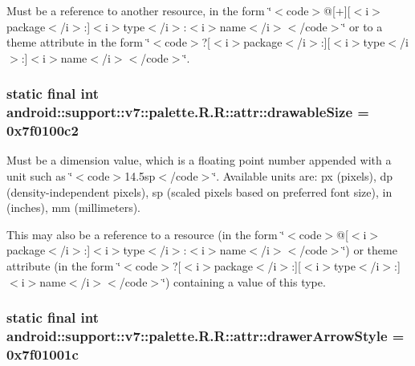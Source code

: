 Must be a reference to another resource, in the form \char`\"{}$<$code$>$@\mbox{[}+\mbox{]}\mbox{[}$<$i$>$package$<$/i$>$:\mbox{]}$<$i$>$type$<$/i$>$:$<$i$>$name$<$/i$>$$<$/code$>$\char`\"{} or to a theme attribute in the form \char`\"{}$<$code$>$?\mbox{[}$<$i$>$package$<$/i$>$:\mbox{]}\mbox{[}$<$i$>$type$<$/i$>$:\mbox{]}$<$i$>$name$<$/i$>$$<$/code$>$\char`\"{}. \hypertarget{classandroid_1_1support_1_1v7_1_1palette_1_1_r_1_1attr_825d54398676292cc2c09cd547800157}{
\subsubsection[{drawableSize}]{\setlength{\rightskip}{0pt plus 5cm}static final int android::support::v7::palette.R.R::attr::drawableSize = 0x7f0100c2}}
\label{classandroid_1_1support_1_1v7_1_1palette_1_1_r_1_1attr_825d54398676292cc2c09cd547800157}


Must be a dimension value, which is a floating point number appended with a unit such as \char`\"{}$<$code$>$14.5sp$<$/code$>$\char`\"{}. Available units are: px (pixels), dp (density-independent pixels), sp (scaled pixels based on preferred font size), in (inches), mm (millimeters). 

This may also be a reference to a resource (in the form \char`\"{}$<$code$>$@\mbox{[}$<$i$>$package$<$/i$>$:\mbox{]}$<$i$>$type$<$/i$>$:$<$i$>$name$<$/i$>$$<$/code$>$\char`\"{}) or theme attribute (in the form \char`\"{}$<$code$>$?\mbox{[}$<$i$>$package$<$/i$>$:\mbox{]}\mbox{[}$<$i$>$type$<$/i$>$:\mbox{]}$<$i$>$name$<$/i$>$$<$/code$>$\char`\"{}) containing a value of this type. \hypertarget{classandroid_1_1support_1_1v7_1_1palette_1_1_r_1_1attr_1c3cdc27a7c2e3f5148a0494e6d3beeb}{
\subsubsection[{drawerArrowStyle}]{\setlength{\rightskip}{0pt plus 5cm}static final int android::support::v7::palette.R.R::attr::drawerArrowStyle = 0x7f01001c}}
\label{classandroid_1_1support_1_1v7_1_1palette_1_1_r_1_1attr_1c3cdc27a7c2e3f5148a0494e6d3beeb}


